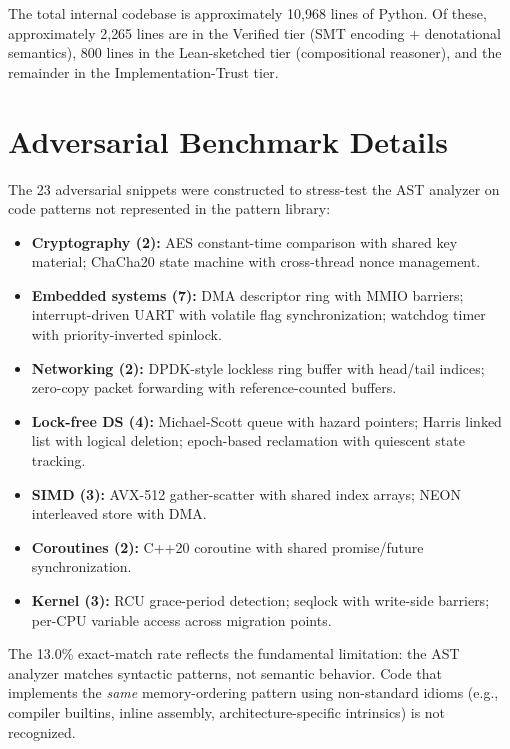 \documentclass[11pt]{article}
\begin{document}
The total internal codebase is approximately 10{,}968 lines of Python.
Of these, approximately 2{,}265 lines are in the Verified tier
(SMT encoding + denotational semantics), 800 lines in the
Lean-sketched tier (compositional reasoner), and the remainder
in the Implementation-Trust tier.

\section{Adversarial Benchmark Details}
\label{app:adversarial-details}

The 23 adversarial snippets were constructed to stress-test the
AST analyzer on code patterns not represented in the pattern library:

\begin{itemize}[nosep]
\item \textbf{Cryptography (2):} AES constant-time comparison with
  shared key material; ChaCha20 state machine with cross-thread
  nonce management.
\item \textbf{Embedded systems (7):} DMA descriptor ring with
  MMIO barriers; interrupt-driven UART with volatile flag
  synchronization; watchdog timer with priority-inverted spinlock.
\item \textbf{Networking (2):} DPDK-style lockless ring buffer
  with head/tail indices; zero-copy packet forwarding with
  reference-counted buffers.
\item \textbf{Lock-free DS (4):} Michael-Scott queue with
  hazard pointers; Harris linked list with logical deletion;
  epoch-based reclamation with quiescent state tracking.
\item \textbf{SIMD (3):} AVX-512 gather-scatter with shared
  index arrays; NEON interleaved store with DMA.
\item \textbf{Coroutines (2):} C++20 coroutine with shared
  promise/future synchronization.
\item \textbf{Kernel (3):} RCU grace-period detection; seqlock
  with write-side barriers; per-CPU variable access across
  migration points.
\end{itemize}

The 13.0\% exact-match rate reflects the fundamental limitation:
the AST analyzer matches syntactic patterns, not semantic behavior.
Code that implements the \emph{same} memory-ordering pattern using
non-standard idioms (e.g., compiler builtins, inline assembly,
architecture-specific intrinsics) is not recognized.
\end{document}
